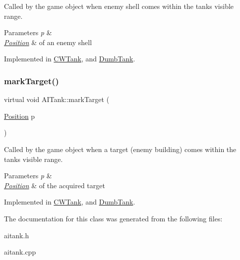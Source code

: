 Called by the game object when enemy shell comes within the tanks visible range. 


\begin{DoxyParams}{Parameters}
{\em p} & \\
\hline
{\em \mbox{\hyperlink{class_position}{Position}}} & of an enemy shell \\
\hline
\end{DoxyParams}


Implemented in \mbox{\hyperlink{class_c_w_tank_aacb17e0a669da6e27ab75d7df088bca7}{C\+W\+Tank}}, and \mbox{\hyperlink{class_dumb_tank_a1269c78542b1f504a388aa04fdecc4a8}{Dumb\+Tank}}.

\mbox{\label{class_a_i_tank_ae59c2164c71b51eeada7d2f7ef6c6238}} 
\subsubsection{\texorpdfstring{mark\+Target()}{markTarget()}}
{\footnotesize\ttfamily virtual void A\+I\+Tank\+::mark\+Target (\begin{DoxyParamCaption}\item[{\mbox{\hyperlink{class_position}{Position}}}]{p }\end{DoxyParamCaption})\hspace{0.3cm}{\ttfamily [pure virtual]}}



Called by the game object when a target (enemy building) comes within the tanks visible range. 


\begin{DoxyParams}{Parameters}
{\em p} & \\
\hline
{\em \mbox{\hyperlink{class_position}{Position}}} & of the acquired target \\
\hline
\end{DoxyParams}


Implemented in \mbox{\hyperlink{class_c_w_tank_a71b365910d43b8c41578087c9c8d8885}{C\+W\+Tank}}, and \mbox{\hyperlink{class_dumb_tank_a06dd83683ff628421d6841a8ad8f1877}{Dumb\+Tank}}.



The documentation for this class was generated from the following files\+:\begin{DoxyCompactItemize}
\item 
aitank.\+h\item 
aitank.\+cpp\end{DoxyCompactItemize}
